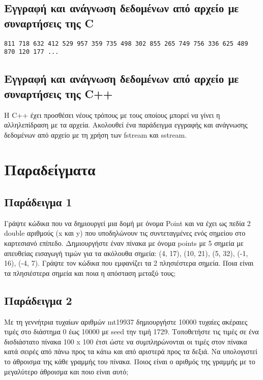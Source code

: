 \subsection{Εγγραφή και ανάγνωση δεδομένων από αρχείο με συναρτήσεις της C}



\begin{lstlisting}[style=DOS]
811 718 632 412 529 957 359 735 498 302 855 265 749 756 336 625 489 870 120 177 ...
\end{lstlisting}

\subsection{Εγγραφή και ανάγνωση δεδομένων από αρχείο με συναρτήσεις της C++}
Η C++ έχει προσθέσει νέους τρόπους με τους οποίους μπορεί να γίνει η αλληλεπίδραση με τα αρχεία. Ακολουθεί ένα παράδειγμα εγγραφής και ανάγνωσης δεδομένων από αρχείο με τη χρήση των fstream και sstream.





\section{Παραδείγματα}
\subsection{Παράδειγμα 1}
Γράψτε κώδικα που να δημιουργεί μια δομή με όνομα Point και να έχει ως πεδία 2 double αριθμούς  (x και y) που υποδηλώνουν τις συντεταγμένες ενός σημείου στο καρτεσιανό επίπεδο. Δημιουργήστε έναν πίνακα με όνομα points με 5 σημεία με απευθείας εισαγωγή τιμών για τα ακόλουθα σημεία: (4, 17), (10, 21), (5, 32), (-1, 16), (-4, 7). Γράψτε τον κώδικα που εμφανίζει τα 2 πλησιέστερα σημεία. Ποια είναι τα πλησιέστερα σημεία και ποια η απόσταση μεταξύ τους;





\subsection{Παράδειγμα 2}
Με τη γεννήτρια τυχαίων αριθμών mt19937 δημιουργήστε 10000 τυχαίες ακέραιες τιμές στο διάστημα 0 έως 10000 με seed την τιμή 1729. Τοποθετήστε τις τιμές σε ένα δισδιάστατο πίνακα 100 x 100 έτσι ώστε να συμπληρώνονται οι τιμές στον πίνακα κατά σειρές από πάνω προς τα κάτω και από αριστερά προς τα δεξιά. Να υπολογιστεί το άθροισμα της κάθε γραμμής του πίνακα. Ποιος είναι ο αριθμός της γραμμής με το μεγαλύτερο άθροισμα και ποιο είναι αυτό;

